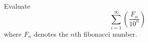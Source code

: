 Evaluate \[\sum^{\infty}_{i=1} ( \dfrac{F_n}{10^n})\]where $F_n$ denotes the $n$th fibonacci number.
